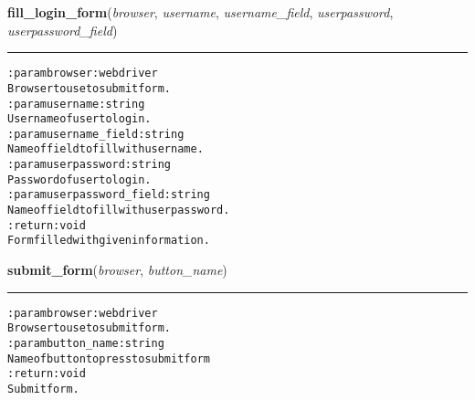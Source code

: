     \vspace{0.5ex}

\hspace{.8\funcindent}\begin{boxedminipage}{\funcwidth}

    \raggedright \textbf{fill\_login\_form}(\textit{browser}, \textit{username}, \textit{username\_field}, \textit{userpassword}, \textit{userpassword\_field})

    \vspace{-1.5ex}

    \rule{\textwidth}{0.5\fboxrule}
\setlength{\parskip}{2ex}
\begin{alltt}

:param browser: webdriver
    Browser to use to submit form.
:param username: string
    Username of user to login.
:param username\_field: string
    Name of field to fill with username.
:param userpassword: string
    Password of user to login.
:param userpassword\_field: string
    Name of field to fill with userpassword.
:return: void
    Form filled with given information.
\end{alltt}

\setlength{\parskip}{1ex}
    \end{boxedminipage}

    \label{hal:internet:selenium:SeleniumForm:submit_form}

    \vspace{0.5ex}

\hspace{.8\funcindent}\begin{boxedminipage}{\funcwidth}

    \raggedright \textbf{submit\_form}(\textit{browser}, \textit{button\_name})

    \vspace{-1.5ex}

    \rule{\textwidth}{0.5\fboxrule}
\setlength{\parskip}{2ex}
\begin{alltt}

:param browser: webdriver
    Browser to use to submit form.
:param button\_name: string
    Name of button to press to submit form
:return: void
    Submit form.
\end{alltt}

\setlength{\parskip}{1ex}
    \end{boxedminipage}

